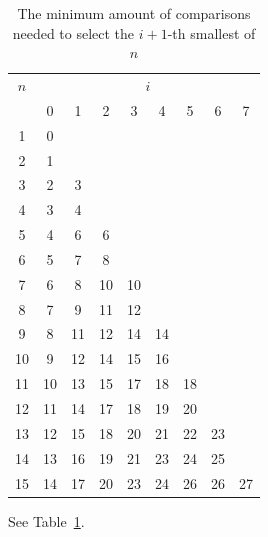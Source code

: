 \documentclass[10pt,journal,compsoc]{IEEEtran}
\begin{document}
\begin{table}
  \centering
  \begin{tabular}{c|cccccccc}
    $n$ & \multicolumn{8}{c}{$i$}                                    \\
        & 0                       & 1  & 2  & 3  & 4  & 5  & 6  & 7  \\ \hline
    1   & 0                                                          \\
    2   & 1                                                          \\
    3   & 2                       & 3                                \\
    4   & 3                       & 4                                \\
    5   & 4                       & 6  & 6                           \\
    6   & 5                       & 7  & 8                           \\
    7   & 6                       & 8  & 10 & 10                     \\
    8   & 7                       & 9  & 11 & 12                     \\
    9   & 8                       & 11 & 12 & 14 & 14                \\
    10  & 9                       & 12 & 14 & 15 & 16                \\
    11  & 10                      & 13 & 15 & 17 & 18 & 18           \\
    12  & 11                      & 14 & 17 & 18 & 19 & 20           \\
    13  & 12                      & 15 & 18 & 20 & 21 & 22 & 23      \\
    14  & 13                      & 16 & 19 & 21 & 23 & 24 & 25      \\
    15  & 14                      & 17 & 20 & 23 & 24 & 26 & 26 & 27 \\
  \end{tabular}
  \caption{The minimum amount of comparisons needed to select the $i+1$-th smallest of $n$}
  \label{table:num-comparisons}
\end{table}

See Table~\ref{table:num-comparisons}.
\end{document}
